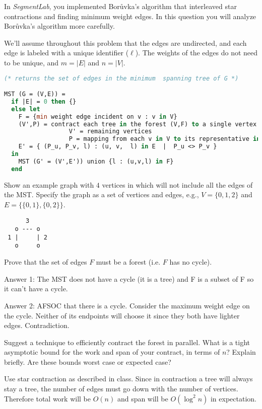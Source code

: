
In \emph{SegmentLab}, you implemented Bor\r{u}vka's algorithm that
interleaved star contractions and finding minimum weight edges.  In
this question you will analyze Bor\r{u}vka's algorithm more carefully.

We'll assume throughout this problem that the edges are undirected,
and each edge is labeled with a unique identifier ($\ell$). The
weights of the edges do not need to be unique, and $m = |E|$ and $n =
|V|$.

\begin{lstlisting}[language=Caml, numbers=none]
(* returns the set of edges in the minimum  spanning tree of G *)

MST (G = (V,E)) = 
  if |E| = 0 then {}
  else let
    F = {min weight edge incident on v : v in V}
    (V',P) = contract each tree in the forest (V,F) to a single vertex
                  V' = remaining vertices
                  P = mapping from each v in V to its representative in V'
    E' = { (P_u, P_v, l) : (u, v,  l) in E  |  P_u <> P_v }
  in 
    MST (G' = (V',E')) union {l : (u,v,l) in F}
  end
\end{lstlisting}

\begin{problem}
\ask[4.]
Show an example graph with $4$ vertices in which  will not include all
the edges of the MST.  Specify the graph as a set of vertices and edges, e.g., $V = \{0, 1, 2\}$ and $E = \{\{0,1\}, \{0,2\}\}$.

\sol
\begin{verbatim}
      3
   o --- o
 1 |     | 2
   o     o
\end{verbatim}

\ask[4.]
Prove that the set of edges $F$ must be a forest (i.e. $F$ has no cycle).

\sol
Answer 1: The MST does not have a cycle (it is a tree) and F is a subset of F
so it can't have a cycle.

Answer 2: AFSOC that there is a cycle.  Consider the maximum weight
edge on the cycle.  Neither of its endpoints will choose it since they
both have lighter edges.  Contradiction.
\end{problem}

\newpage

\begin{problem}[4.]
\ask
Suggest a technique to efficiently contract the forest in parallel.
What is a tight asymptotic bound for the work and span of your contract,
in terms of $n$? Explain briefly. Are these bounds worst case or
expected case?

\sol
Use star contraction as described in class. Since in contraction a tree
will always stay a tree, the number of edges must go down with the number
of vertices. Therefore total work will be $O(n)$ and span will be
$O(\log^2 n)$ in expectation.
\end{problem}

